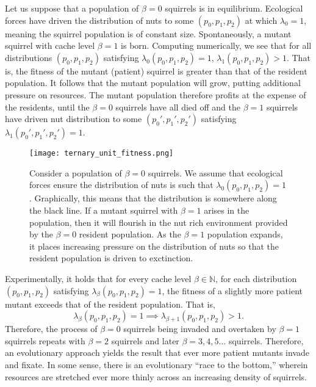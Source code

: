 \documentclass[titlepage, hidelinks, 12pt]{article}
\theoremstyle{plain}
\theoremstyle{remark}
\theoremstyle{definition}
\newcommand{\N}{\mathbb{N}}
\begin{document}
Let us suppose that a population of $\beta = 0$ squirrels is in equilibrium. 
Ecological forces have driven the distribution of nuts to some $(p_0, p_1, p_2)$ at which $\lambda_0 =1$,
meaning the squirrel population is of constant size. Spontaneously, a mutant squirrel with cache level $\beta = 1$ is born. Computing numerically,
we see that for all distributions $(p_0,p_1,p_2)$ satisfying $\lambda_0(p_0, p_1, p_2) = 1$, $\lambda_1(p_0,p_1,p_2)>1$. That is, the fitness
of the mutant (patient) squirrel is greater than that of the resident population. It follows that the mutant population will grow, putting additional
pressure on resources. The mutant population therefore profits at the expense of the residents, until the $\beta = 0$ squirrels have all died off
and the $\beta = 1$ squirrels have driven nut distribution to some $(p_0', p_1', p_2')$ satisfying $\lambda_1(p_0', p_1', p_2') = 1$. 

\begin{figure}[H]
    \centering
    \texttt{[image: ternary\_unit\_fitness.png]}
    \caption[Ternary plot showing invasion capacity of patient squirrels under density dependence.]{Consider a population of $\beta = 0$ squirrels. We assume that ecological forces ensure the distribution of nuts is such
    that $\lambda_0(p_0, p_1, p_2) = 1$. Graphically, this means that the distribution is somewhere along the black line. If a mutant
squirrel with $\beta = 1$ arises in the population, then it will flourish in the nut rich environment provided by the $\beta = 0$ resident
population. As the $\beta = 1$ population expands, it places increasing pressure on the distribution of nuts so that the resident population
is driven to exctinction. }
    \label{fig:unit_fitness}
\end{figure}

Experimentally, it holds that for every cache level $\beta\in\N$, for each distribution $(p_0, p_1, p_2)$ satisfying $\lambda_\beta(p_0, p_1, p_2) = 1$,
the fitness of a slightly more patient mutant exceeds that of the resident population. That is, 
$$ \lambda_{\beta}(p_0, p_1, p_2) = 1 \implies  \lambda_{\beta+1}(p_0, p_1, p_2) > 1.$$
Therefore,
the process of $\beta = 0$ squirrels being invaded and overtaken by $\beta = 1$ squirrels repeats with $\beta = 2$ squirrels and later 
$\beta = 3, 4, 5\ldots$ squirrels. Therefore, an evolutionary approach yields the result that ever more patient mutants invade and fixate. In some
sense, there is an evolutionary ``race to the bottom,'' wherein resources are stretched ever more thinly across an increasing density
of squirrels. 
\end{document}

